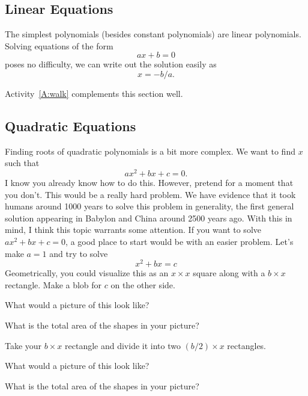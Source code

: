 \subsection{Linear Equations}

The simplest polynomials (besides constant polynomials) are linear
polynomials. Solving equations of the form
\[
ax + b = 0
\]
poses no difficulty, we can write out the solution easily as
\[
x = -b/a.
\]


\begin{teachingnote}
Activity~\ref{A:walk} complements this section well. 
\end{teachingnote}


\subsection{Quadratic Equations}

Finding roots of quadratic polynomials is a bit more complex. We want
to find $x$ such that
\[
ax^2 + bx + c = 0.
\]
I know you already know how to do this. However, pretend for a moment
that you don't. This would be a really hard problem. We have evidence
that it took humans around 1000 years to solve this problem in
generality, the first general solution appearing in Babylon and China
around 2500 years ago. With this in mind, I think this topic warrants
some attention. If you want to solve $ax^2 + bx + c = 0$, a good place
to start would be with an easier problem. Let's make $a=1$ and try to
solve
\[
x^2 + b x = c
\]
Geometrically, you could visualize this as an $x \times x$ square
along with a $b\times x$ rectangle. Make a blob for $c$ on the other side. 

\begin{question} What would a picture of this look like?
\end{question}
\QM

\begin{question} What is the total area of the shapes in your picture?
\end{question}
\QM

Take your $b\times x$ rectangle and divide it into two
$(b/2)\times x$ rectangles.

\begin{question} What would a picture of this look like?
\end{question}
\QM

\begin{question} What is the total area of the shapes in your picture?
\end{question}
\QM

